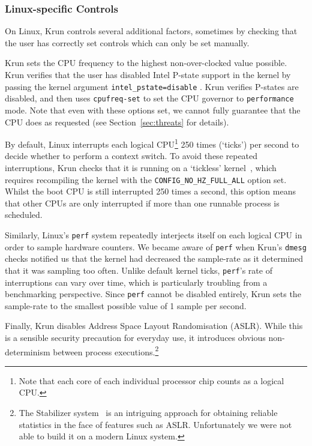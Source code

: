 \documentclass[preprint,numbers,10pt]{sigplanconf}
\newcommand{\krun}{Krun\xspace}
\begin{document}
\subsubsection{Linux-specific Controls}

On Linux, \krun controls several additional factors, sometimes by checking that
the user has correctly set controls which can only be set manually.

\krun sets the CPU frequency to the highest non-over-clocked value possible.
\krun verifies that the user has disabled Intel P-state support in
the kernel by passing the kernel argument \texttt{intel\_pstate=disable} .
\krun verifies P-states are disabled, and then uses \texttt{cpufreq-set} to set
the CPU governor to \texttt{performance} mode. Note that even with these
options set, we cannot fully guarantee that the CPU does as requested
(see Section~\ref{sec:threats} for details).

By default, Linux interrupts each logical CPU\footnote{Note that each core of
each individual processor chip counts as a logical CPU.} 250 times (`ticks') per second to
decide whether to perform a context switch. To avoid these repeated
interruptions, \krun checks that it is running on a `tickless'
kernel~\cite{tickless}, which requires recompiling the kernel with the
\texttt{CONFIG\_NO\_HZ\_FULL\_ALL} option set. Whilst the boot CPU is still
interrupted 250 times a second, this option means that other CPUs are only
interrupted if more than one runnable process is scheduled.

Similarly, Linux's \texttt{perf} system repeatedly interjects itself  on each logical CPU in order to sample hardware counters. We became
aware of \texttt{perf} when \krun's \texttt{dmesg} checks notified us that the
kernel had decreased the sample-rate as it determined that it was sampling too
often. Unlike default kernel ticks, \texttt{perf}'s rate of interruptions can
vary over time, which is particularly troubling from a benchmarking perspective.
Since \texttt{perf} cannot be disabled entirely,
\krun sets the sample-rate to the smallest possible value of 1 sample per
second.

Finally, \krun disables Address Space Layout Randomisation (ASLR). While this is
a sensible security precaution for everyday use, it introduces obvious
non-determinism between process executions.\footnote{The Stabilizer
system~\cite{curtsinger13stabilizer} is an intriguing approach for obtaining reliable
statistics in the face of features such as ASLR. Unfortunately we were not able
to build it on a modern Linux system.}
\end{document}
